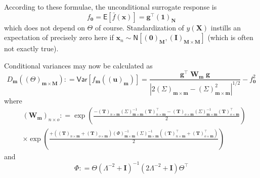 \documentclass[preprint,12pt]{elsarticle}
\newcommand*{\M}[1]{\ensuremath{#1}\xspace}
\newcommand*{\vr}[1]{\M{\mathbf{#1}}}
\newcommand*{\deq}{\M{\mathrel{\mathop:}=}}
\newcommand*{\ev}[1]{\mathsf{E}\!\left\lbrack{} #1 \right\rbrack}
\newcommand*{\var}[1]{\mathsf{Var}\!\left\lbrack{} #1 \right\rbrack}
\newcommand*{\gauss}[2]{\mathsf{N}\!\left\lbrack{} #1 , #2 \right\rbrack}
\newcommand*{\modulus}[1]{\M{\left\lvert#1\right\rvert}}
\begin{document}
            According to these formulae, the unconditional surrogate response is
            \begin{equation} \label{eq:Method:GSA:f_0}
                f_{\vr{0}} = \ev{\bar{f}(\vr{x})} = \vr{g}^{\intercal} (\vr{1})_{\vr{N}}
            \end{equation}
            which does not depend on $\Theta$ of course. Standardization of $y(\vr{X})$ instills an expectation of precisely zero here if $\vr{x}_{n} \sim \gauss{(\vr{0})_{\vr{M}}}{(\vr{I})_{\vr{M}\times\vr{M}}}$ (which is often not exactly true).

            Conditional variances may now be calculated as
            \begin{equation} \label{eq:Method:GSA:DmDef}
                D_{\vr{m}}((\Theta)_{\vr{m}\times\vr{M}}) \deq \var{f_{\vr{m}}((\vr{u})_{\vr{m}})}
                = \frac {\vr{g}^{\intercal} \; \vr{W}_{\vr{m}} \; \vr{g}}
                    {\modulus{2(\Sigma)_{\vr{m}\times\vr{m}} - (\Sigma)_{\vr{m}\times\vr{m}}^{2}}^{1/2}}
                - f_{\vr{0}}^{2}
            \end{equation}
            where
            \begin{equation} \label{eq:Method:GSA:WmDef}
                \begin{aligned}
                    &(\vr{W}_{\vr{m}})_{n \times o} \deq
                    \exp\!\left(\frac{
                        -(\vr{T})_{n\times\vr{m}}(\Sigma)_{\vr{m}\times\vr{m}}^{-1}
                        (\vr{T})_{n\times\vr{m}}^{\intercal} 
                        -(\vr{T})_{o\times\vr{m}}(\Sigma)_{\vr{m}\times\vr{m}}^{-1}
                        (\vr{T})_{o\times\vr{m}}^{\intercal}
                        }{2}\right) \\
                        &\times\exp\!\left(\frac{
                            + \left((\vr{T})_{n\times\vr{m}}+(\vr{T})_{o\times\vr{m}}\right)
                            (\Phi)_{\vr{m}\times\vr{m}}^{-1}(\Sigma)_{\vr{m}\times\vr{m}}^{-1}
                            \left((\vr{T})_{n\times\vr{m}}^{\intercal}+(\vr{T})_{o\times\vr{m}}^{\intercal}\right)
                            }{2}\right)
                \end{aligned}
            \end{equation}
            and
            \begin{equation} \label{eq:Method:GSA:PhiDef}
                \Phi \deq \Theta \left(\Lambda^{-2}+\vr{I}\right)^{-1}\left(2\Lambda^{-2}+\vr{I}\right) 
                \Theta^{\intercal}
            \end{equation}
\end{document}
